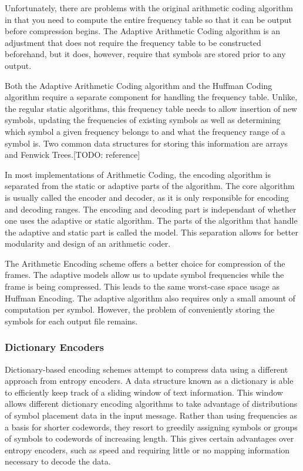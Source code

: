 \documentclass[a4paper,11pt]{report}
\begin{document}
Unfortunately, there are problems with the original arithmetic coding algorithm in that you need to compute the entire frequency table so that it can be output before compression begins. The Adaptive Arithmetic Coding algorithm is an adjustment that does not require the frequency table to be constructed beforehand, but it does, however, require that symbols are stored prior to any output. 

Both the Adaptive Arithmetic Coding algorithm and the Huffman Coding algorithm require a separate component for handling the frequency table. Unlike, the regular static algorithms, this frequency table needs to allow insertion of new symbols, updating the frequencies of existing symbols as well as determining which symbol a given frequency belongs to and what the frequency range of a symbol is. Two common data structures for storing this information are arrays and Fenwick Trees.[TODO: reference]

In most implementations of Arithmetic Coding, the encoding algorithm is separated from the static or adaptive parts of the algorithm. The core algorithm is usually called the encoder and decoder, as it is only responsible for encoding and decoding ranges. The encoding and decoding part is independant of whether one uses the adaptive or static algorithm. The parts of the algorithm that handle the adaptive and static part is called the model. This separation allows for better modularity and design of an arithmetic coder.

The Arithmetic Encoding scheme offers a better choice for compression of the frames. The adaptive models allow us to update symbol frequencies while the frame is being compressed. This leads to the same worst-case space usage as Huffman Encoding. The adaptive algorithm also requires only a small amount of computation per symbol. However, the problem of conveniently storing the symbols for each output file remains.

\subsubsection{Dictionary Encoders}

Dictionary-based encoding schemes attempt to compress data using a different approach from entropy encoders\cite{RefWorks:2}. A data structure known as a dictionary is able to efficiently keep track of a sliding window of text information. This window allows different dictionary encoding algorithms to take advantage of distributions of symbol placement data in the input message. Rather than using frequencies as a basis for shorter codewords, they resort to greedily assigning symbols or groups of symbols to codewords of increasing length. This gives certain advantages over entropy encoders, such as speed and requiring little or no mapping information necessary to decode the data. 
\end{document}
